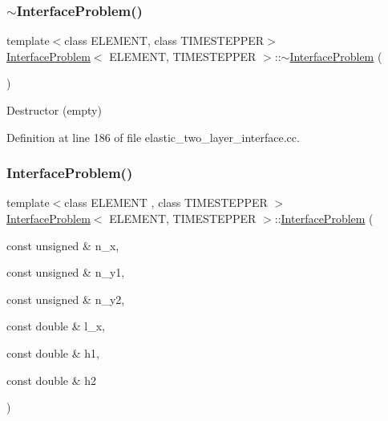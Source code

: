\mbox{\label{classInterfaceProblem_a90c191f8046069099b199743e7ce7111}} 
\subsubsection{\texorpdfstring{$\sim$\+Interface\+Problem()}{~InterfaceProblem()}\hspace{0.1cm}{\footnotesize\ttfamily [1/2]}}
{\footnotesize\ttfamily template$<$class E\+L\+E\+M\+E\+NT, class T\+I\+M\+E\+S\+T\+E\+P\+P\+ER$>$ \\
\hyperlink{classInterfaceProblem}{Interface\+Problem}$<$ E\+L\+E\+M\+E\+NT, T\+I\+M\+E\+S\+T\+E\+P\+P\+ER $>$\+::$\sim$\hyperlink{classInterfaceProblem}{Interface\+Problem} (\begin{DoxyParamCaption}{ }\end{DoxyParamCaption})\hspace{0.3cm}{\ttfamily [inline]}}



Destructor (empty) 



Definition at line 186 of file elastic\+\_\+two\+\_\+layer\+\_\+interface.\+cc.

\mbox{\label{classInterfaceProblem_ae8ecf0f5a7217bc9428d8798807de37d}} 
\subsubsection{\texorpdfstring{Interface\+Problem()}{InterfaceProblem()}\hspace{0.1cm}{\footnotesize\ttfamily [2/2]}}
{\footnotesize\ttfamily template$<$class E\+L\+E\+M\+E\+NT , class T\+I\+M\+E\+S\+T\+E\+P\+P\+ER $>$ \\
\hyperlink{classInterfaceProblem}{Interface\+Problem}$<$ E\+L\+E\+M\+E\+NT, T\+I\+M\+E\+S\+T\+E\+P\+P\+ER $>$\+::\hyperlink{classInterfaceProblem}{Interface\+Problem} (\begin{DoxyParamCaption}\item[{const unsigned \&}]{n\+\_\+x,  }\item[{const unsigned \&}]{n\+\_\+y1,  }\item[{const unsigned \&}]{n\+\_\+y2,  }\item[{const double \&}]{l\+\_\+x,  }\item[{const double \&}]{h1,  }\item[{const double \&}]{h2 }\end{DoxyParamCaption})}



